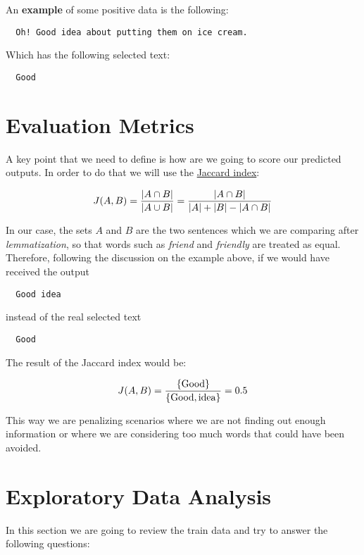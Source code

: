 \documentclass[11pt]{article}
\begin{document}
An \textbf{example} of some positive data is the following:

\begin{verbatim}
  Oh! Good idea about putting them on ice cream.
\end{verbatim}

Which has the following selected text:

\begin{verbatim}
  Good
\end{verbatim}

\section{Evaluation Metrics}

A key point that we need to define is how are we going to score our predicted outputs. In order to do that we will use the \href{https://en.wikipedia.org/wiki/Jaccard_index}{Jaccard index}:

\[
J(A,B) = {{|A \cap B|}\over{|A \cup B|}} = {{|A \cap B|}\over{|A| + |B| - |A \cap B|}}
\]

In our case, the sets $A$ and $B$ are the two sentences which we are comparing after \textit{lemmatization}, so that words such as \textit{friend} and \textit{friendly} are treated as equal. Therefore, following the discussion on the example above, if we would have received the output

\begin{verbatim}
  Good idea
\end{verbatim}

instead of the real selected text

\begin{verbatim}
  Good
\end{verbatim}

The result of the Jaccard index would be:

\[
J(A,B) = {{\{\text{Good}\}}\over{\{\text{Good}, \text{idea}\}}} = 0.5
\]

This way we are penalizing scenarios where we are not finding out enough information or where we are considering too much words that could have been avoided.

\section{Exploratory Data Analysis}

In this section we are going to review the train data and try to answer the following questions:
\end{document}

